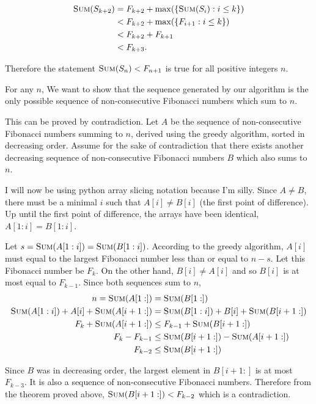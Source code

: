 \documentclass{article}
\begin{document}
\begin{solution}
\begin{enumerate}[label = (\alph*)]
    \begin{align*}
    \textsc{Sum}(S_{k+2})&=F_{k+2} + \mathrm{max}(\{\textsc{Sum}(S_i):i\leq k\})\\
    &< F_{k+2} + \mathrm{max}(\{F_{i+1}:i\leq k\})\\
    &< F_{k+2} + F_{k+1}\\
    &< F_{k+3}.
    \end{align*}

    Therefore the statement $\textsc{Sum}(S_n) < F_{n+1}$ is true for all positive integers $n$.

    For any $n$, We want to show that the sequence generated by our algorithm is the only possible sequence of non-consecutive Fibonacci numbers which sum to $n$.
    
    This can be proved by contradiction. 
    Let $A$ be the sequence of non-consecutive Fibonacci numbers summing to $n$, derived using the greedy algorithm, sorted in decreasing order.
    Assume for the sake of contradiction that there exists another decreasing sequence of non-consecutive Fibonacci numbers $B$ which also sums to $n$.

    I will now be using python array slicing notation because I'm silly.
    Since $A\neq B$, there must be a minimal $i$ such that $A[i]\neq B[i]$ (the first point of difference). 
    Up until the first point of difference, the arrays have been identical, $A[1:i]=B[1:i]$. 
    
    Let $s = \textsc{Sum}(A[1:i]) = \textsc{Sum}(B[1:i])$. According to the greedy algorithm, $A[i]$ must equal to the largest Fibonacci number less than or equal to $n-s$. Let this Fibonacci number be $F_k$. On the other hand, $B[i]\neq A[i]$ and so $B[i]$ is at most equal to $F_{k-1}$. 
    Since both sequences sum to $n$,
    \begin{align*}
        n=\textsc{Sum}(A[1:]) &= \textsc{Sum}(B[1:])\\
        \textsc{Sum}(A[1:i]) + A[i] + \textsc{Sum}(A[i+1:]) &= \textsc{Sum}(B[1:i]) + B[i] + \textsc{Sum}(B[i+1:])\\
        F_k + \textsc{Sum}(A[i+1:]) &\leq F_{k-1} + \textsc{Sum}(B[i+1:])\\
        F_k - F_{k-1} &\leq \textsc{Sum}(B[i+1:]) - \textsc{Sum}(A[i+1:])\\
        F_{k-2} &\leq \textsc{Sum}(B[i+1:])
    \end{align*}
    
    Since $B$ was in decreasing order, the largest element in $B[i+1:]$ is at most $F_{k-3}$. 
    It is also a sequence of non-consecutive Fibonacci numbers.
    Therefore from the theorem proved above, $\textsc{Sum}(B[i+1:]) < F_{k-2}$ which is a contradiction.


\end{enumerate}
\end{solution}
\end{document}
